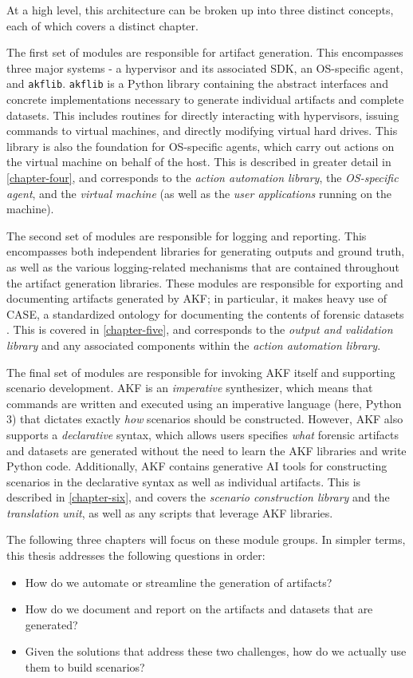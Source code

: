 At a high level, this architecture can be broken up into three distinct
concepts, each of which covers a distinct chapter.

The first set of modules are responsible for artifact generation. This
encompasses three major systems - a hypervisor and its associated SDK,
an OS-specific agent, and \texttt{akflib}. \texttt{akflib} is a Python
library containing the abstract interfaces and concrete implementations
necessary to generate individual artifacts and complete datasets. This
includes routines for directly interacting with hypervisors, issuing
commands to virtual machines, and directly modifying virtual hard
drives. This library is also the foundation for OS-specific agents,
which carry out actions on the virtual machine on behalf of the host.
This is described in greater detail in \autoref{chapter-four}, and corresponds to the \emph{action automation library},
the \emph{OS-specific agent}, and the \emph{virtual machine} (as well as
the \emph{user applications} running on the machine).

The second set of modules are responsible for logging and reporting.
This encompasses both independent libraries for generating outputs and
ground truth, as well as the various logging-related mechanisms that are
contained throughout the artifact generation libraries. These modules
are responsible for exporting and documenting artifacts generated by
AKF; in particular, it makes heavy use of CASE, a standardized ontology
for documenting the contents of forensic datasets
\cite{caseyAdvancingCoordinatedCyberinvestigations2017}. This is
covered in \autoref{chapter-five}, and corresponds to the
\emph{output and validation library} and any associated components
within the \emph{action automation library}.

The final set of modules are responsible for invoking AKF itself and
supporting scenario development. AKF is an \emph{imperative}
synthesizer, which means that commands are written and executed using an
imperative language (here, Python 3) that dictates exactly \emph{how}
scenarios should be constructed. However, AKF also supports a
\emph{declarative} syntax, which allows users specifies \emph{what}
forensic artifacts and datasets are generated without the need to learn
the AKF libraries and write Python code. Additionally, AKF contains
generative AI tools for constructing scenarios in the declarative syntax
as well as individual artifacts. This is described in \autoref{chapter-six}, and covers the \emph{scenario construction library}
and the \emph{translation unit}, as well as any scripts that leverage
AKF libraries.

The following three chapters will focus on these module groups. In
simpler terms, this thesis addresses the following questions in order:

\begin{itemize}
\tightlist
\item
  How do we automate or streamline the generation of artifacts?
\item
  How do we document and report on the artifacts and datasets that are
  generated?
\item
  Given the solutions that address these two challenges, how do we
  actually use them to build scenarios?
\end{itemize}
